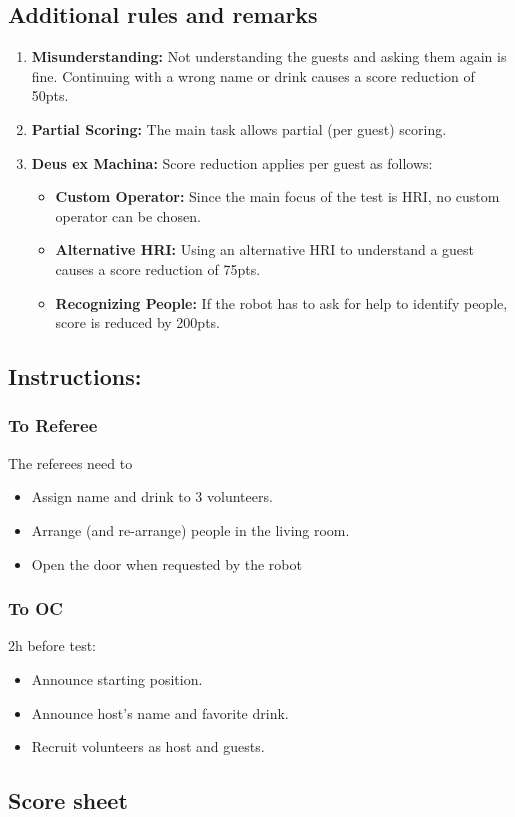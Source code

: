 \subsection*{Additional rules and remarks}
\begin{enumerate}[nosep]
	\item \textbf{Misunderstanding:} Not understanding the guests and asking them again is fine. Continuing with a wrong name or drink causes a score reduction of 50pts.
		
	\item \textbf{Partial Scoring:} The main task allows partial (per guest) scoring.
	
	\item \textbf{Deus ex Machina:} Score reduction applies per guest as follows:
	\begin{itemize}[nosep]
		\item \textbf{Custom Operator:} Since the main focus of the test is HRI, no custom operator can be chosen.
		\item \textbf{Alternative HRI:} Using an alternative HRI to understand a guest causes a score reduction of 75pts.
		\item \textbf{Recognizing People:} If the robot has to ask for help to identify people, score is reduced by 200pts. 
	\end{itemize}
\end{enumerate}


\subsection*{Instructions:}

\subsubsection*{To Referee}

The referees need to
\begin{itemize}
	\item Assign name and drink to 3 volunteers.
	\item Arrange (and re-arrange) people in the living room.
	\item Open the door when requested by the robot
\end{itemize}

\subsubsection*{To OC}

2h before test:
\begin{itemize}
	\item Announce starting position.
	\item Announce host's name and favorite drink.
	\item Recruit volunteers as host and guests.
\end{itemize}

\subsection*{Score sheet}


